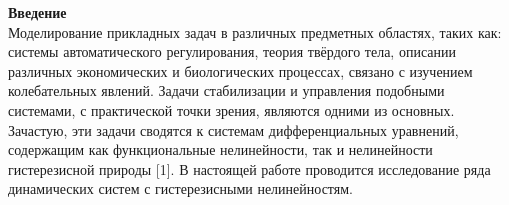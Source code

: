 \vzmscaption


\textbf{Введение}\\
Моделирование прикладных задач в различных предметных областях, таких как: системы автоматического регулирования, теория твёрдого тела, описании различных экономических и биологических процессах, связано с изучением колебательных явлений. Задачи стабилизации и управления подобными системами, с практической точки зрения, являются одними из основных. Зачастую, эти задачи сводятся к системам дифференциальных уравнений, содержащим как функциональные нелинейности, так и нелинейности гистерезисной природы [1]. В настоящей работе проводится исследование ряда динамических систем с гистерезисными нелинейностям.\\

